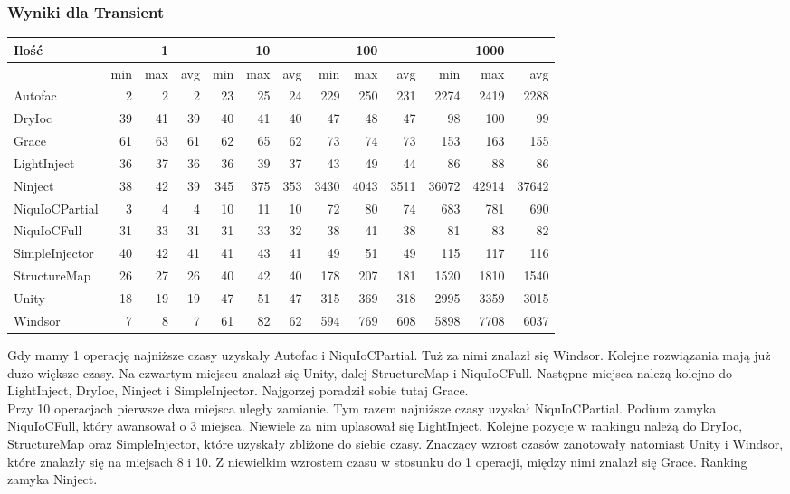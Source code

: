 \documentclass[12pt]{article}
\begin{document}
\subsubsection{Wyniki dla Transient}
\begin{center}
\begin{small}
	\begin{tabular}{ | l | r r r | r r r | r r r | r r r | }
    		\hline
Ilość & & 1 & & & 10 & & & 100 & & & 1000 & \\ \hline
 & min & max & avg & min & max & avg & min & max & avg & min & max & avg \\ \hline
Autofac & 2 & 2 & 2 & 23 & 25 & 24 & 229 & 250 & 231 & 2274 & 2419 & 2288 \\ \hline
DryIoc & 39 & 41 & 39 & 40 & 41 & 40 & 47 & 48 & 47 & 98 & 100 & 99 \\ \hline
Grace & 61 & 63 & 61 & 62 & 65 & 62 & 73 & 74 & 73 & 153 & 163 & 155 \\ \hline
LightInject & 36 & 37 & 36 & 36 & 39 & 37 & 43 & 49 & 44 & 86 & 88 & 86 \\ \hline
Ninject & 38 & 42 & 39 & 345 & 375 & 353 & 3430 & 4043 & 3511 & 36072 & 42914 & 37642 \\ \hline
NiquIoCPartial & 3 & 4 & 4 & 10 & 11 & 10 & 72 & 80 & 74 & 683 & 781 & 690 \\ \hline
NiquIoCFull & 31 & 33 & 31 & 31 & 33 & 32 & 38 & 41 & 38 & 81 & 83 & 82 \\ \hline
SimpleInjector & 40 & 42 & 41 & 41 & 43 & 41 & 49 & 51 & 49 & 115 & 117 & 116 \\ \hline
StructureMap & 26 & 27 & 26 & 40 & 42 & 40 & 178 & 207 & 181 & 1520 & 1810 & 1540 \\ \hline
Unity & 18 & 19 & 19 & 47 & 51 & 47 & 315 & 369 & 318 & 2995 & 3359 & 3015 \\ \hline
Windsor & 7 & 8 & 7 & 61 & 82 & 62 & 594 & 769 & 608 & 5898 & 7708 & 6037 \\ \hline
  	\end{tabular}
\end{small}
\end{center}
Gdy mamy 1 operację najniższe czasy uzyskały Autofac i NiquIoCPartial. Tuż za nimi znalazł się Windsor. Kolejne rozwiązania mają już dużo większe czasy. Na czwartym miejscu znalazł się Unity, dalej StructureMap i NiquIoCFull. Następne miejsca należą kolejno do LightInject, DryIoc, Ninject i SimpleInjector. Najgorzej poradził sobie tutaj Grace.\\
Przy 10 operacjach pierwsze dwa miejsca uległy zamianie. Tym razem najniższe czasy uzyskał NiquIoCPartial. Podium zamyka NiquIoCFull, który awansował o 3 miejsca. Niewiele za nim uplasował się LightInject. Kolejne pozycje w rankingu należą do DryIoc, StructureMap oraz SimpleInjector, które uzyskały zbliżone do siebie czasy. Znaczący wzrost czasów zanotowały natomiast Unity i Windsor, które znalazły się na miejsach 8 i 10. Z niewielkim wzrostem czasu w stosunku do 1 operacji, między nimi znalazł się Grace. Ranking zamyka Ninject.\\
\end{document}
